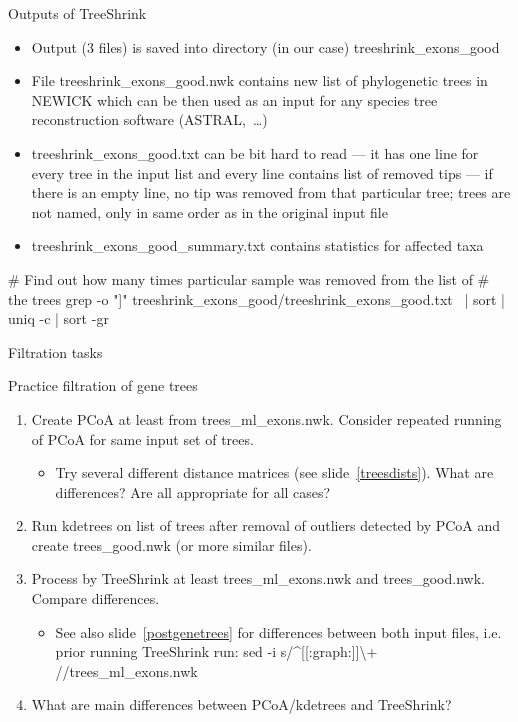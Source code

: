 \documentclass[compress,  xelatex, 11pt, xcolor=x11names, aspectratio=169,
	hyperref={
		bookmarks=true,
		unicode=true,
		colorlinks=true,
		pdftitle={HybSeq course},
		plainpages=false,
		pdfauthor={Vojtech Zeisek},
		pdfsubject={Practical processing of HybSeq target enrichment sequencing data on computing grids like MetaCentrum},
		pdfcreator={XeLaTeX},
		pdfkeywords={BASH, command line, GNU, HybSeq, Linux, MetaCentrum, sequencing shell, target enrichment},
		linkcolor=Turquoise4, %
		anchorcolor=DodgerBlue4, %
		citecolor=DodgerBlue4, %
		filecolor=DodgerBlue4, %
		menucolor=Tan4, %
		urlcolor=DarkOliveGreen4 %
		},
	url={hyphens, lowtilde} %
	]{beamer}
\renewcommand{\texttt}[1]{\colorbox{Cornsilk2}{{\ttfamily #1}}}
\begin{document}
\begin{frame}[fragile]{Outputs of TreeShrink}
	\begin{itemize}
		\item Output (3 files) is saved into directory (in our case) \texttt{treeshrink\_exons\_good}
		\item File \texttt{treeshrink\_exons\_good.nwk} contains new list of phylogenetic trees in \texttt{NEWICK} which can be then used as an input for any species tree reconstruction software (ASTRAL,~\ldots)
		\item \texttt{treeshrink\_exons\_good.txt} can be bit hard to read --- it has one line for every tree in the input list and every line contains list of removed tips --- if there is an empty line, no tip was removed from that particular tree; trees are not named, only in same order as in the original input file
		\item \texttt{treeshrink\_exons\_good\_summary.txt} contains statistics for affected taxa
	\end{itemize}
	\begin{bashcode}
    # Find out how many times particular sample was removed from the list of
    # the trees
    grep -o "\<[[:graph:]]\+\>" treeshrink_exons_good/treeshrink_exons_good.txt \
      | sort | uniq -c | sort -gr
	\end{bashcode}
\end{frame}

\begin{frame}{Filtration tasks}
	\begin{exampleblock}{Practice filtration of gene trees}
		\begin{enumerate}
			\item Create PCoA at least from \texttt{trees\_ml\_exons.nwk}. Consider repeated running of PCoA for same input set of trees.
			\begin{itemize}
				\item Try several different distance matrices (see slide~\ref{treesdists}). What are differences? Are all appropriate for all cases?
			\end{itemize}
			\item Run kdetrees on list of trees after removal of outliers detected by PCoA and create \texttt{trees\_good.nwk} (or more similar files).
			\item Process by TreeShrink at least \texttt{trees\_ml\_exons.nwk} and \texttt{trees\_good.nwk}. Compare differences.
			\begin{itemize}
				\item See also slide~\ref{postgenetrees} for differences between both input files, i.e. prior running TreeShrink run: \texttt{sed -i \textquotesingle s/\^{}[[:graph:]]\textbackslash{}+{ }//\textquotesingle{ }trees\_ml\_exons.nwk}
			\end{itemize}
			\item What are main differences between PCoA/kdetrees and TreeShrink?
		\end{enumerate}
	\end{exampleblock}
\end{frame}
\end{document}
